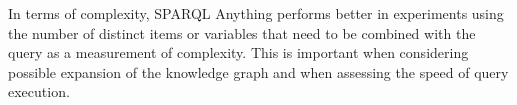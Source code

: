 In terms of complexity, SPARQL Anything performs better in experiments using the number of distinct items or variables that need to be combined with the query as a measurement of complexity. \cite{sparqlanything} This is important when considering possible expansion of the knowledge graph and when assessing the speed of query execution. 
